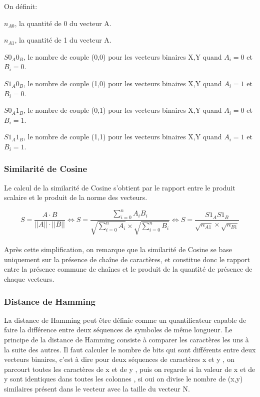 \documentclass[a4paper, 12pt, twoside]{article}
\begin{document}
On définit:

   $n_{A0}$, la quantité de 0 du vecteur A.
   
   $n_{A1}$, la quantité de 1 du vecteur A.
    
   $S0_{A}0_{B}$, le nombre de couple (0,0) pour les vecteurs binaires X,Y quand $A_{i} = 0$ et $B_{i} = 0$.

   $S1_{A}0_{B}$, le nombre de couple (1,0) pour les vecteurs binaires X,Y quand $A_{i} = 1$ et $B_{i} = 0$.

   $S0_{A}1_{B}$, le nombre de couple (0,1) pour les vecteurs binaires X,Y quand $A_{i} = 0$ et $B_{i} = 1$.

   $S1_{A}1_{B}$, le nombre de couple (1,1) pour les vecteurs binaires X,Y quand $A_{i} = 1$ et $B_{i} = 1$.\\
   


\subsubsection{Similarité de Cosine}
Le calcul de la similarité de Cosine s'obtient par le rapport entre le produit scalaire et le produit de la norme des vecteurs.

\[
    S = \frac{A \cdot B}{||A|| \cdot ||B||}
    \Leftrightarrow S = \frac{\sum_{i=0}^n A_{i}B_{i}}{\sqrt{\sum_{i=0}^n A_{i}}\times\sqrt{\sum_{i=0}^n B_{i}}}
    \Leftrightarrow S = \frac{S1_{A}S1_{B}}{\sqrt{n_{A1}}\times \sqrt{n_{B1}}}
\]\\
Après cette simplification, on remarque que la similarité de Cosine se base uniquement sur la présence de chaîne de caractères, et constitue donc le rapport entre la présence commune de chaînes et le produit de la quantité de présence de chaque vecteurs.
\subsubsection{Distance de Hamming}
La distance de Hamming peut être définie comme un quantificateur capable de faire la différence entre deux séquences de symboles de même longueur.
Le principe de la distance de Hamming consiste à comparer les caractères les uns à la suite des autres.
Il faut calculer le nombre de bits qui sont différents entre deux vecteurs binaires, c’est à dire pour deux séquences de caractères x et y , on parcourt toutes les caractères de x et de y , puis on regarde si la valeur de x et de y sont identiques dans toutes les colonnes , si oui on divise le nombre de (x,y) similaires présent dans le vecteur avec la taille du vecteur N. 
\end{document}
